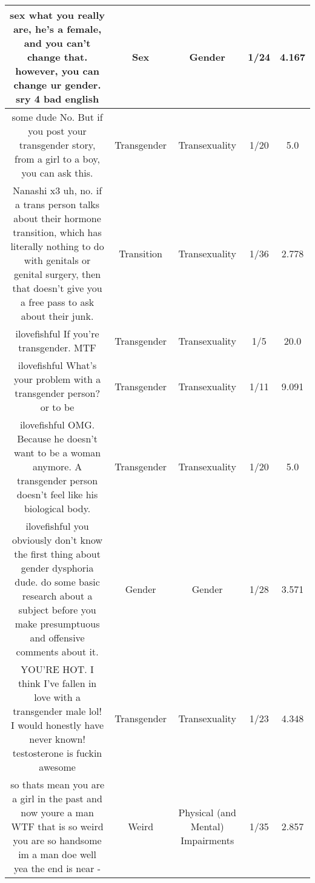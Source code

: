 \documentclass[11pt]{article}
\newlength\mylength
\begin{document}
\begin{center}
\begin{longtable}{|C{.40\mylength}|C{.30\mylength}|C{.15\mylength}|C{.15\mylength}|C{.15\mylength}|}
  sex   what you really are, he's a female, and you can't change that. however, you can change ur gender. sry 4 bad english  & Sex & Gender & 1/24 & 4.167 \\  \hline
   some dude No. But if you post your transgender story, from a girl to a boy, you can ask this.  & Transgender & Transexuality & 1/20 & 5.0 \\  \hline
   Nanashi x3 uh, no. if a trans person talks about their hormone transition, which has literally nothing to do with genitals or genital surgery, then that doesn't give you a free pass to ask about their junk.  & Transition & Transexuality & 1/36 & 2.778 \\  \hline
   ilovefishful If you're transgender. MTF  & Transgender & Transexuality & 1/5 & 20.0 \\  \hline
   ilovefishful What's your problem with a transgender person? or to be  & Transgender & Transexuality & 1/11 & 9.091 \\  \hline
   ilovefishful OMG. Because he doesn't want to be a woman anymore. A transgender person doesn't feel like his biological body.  & Transgender & Transexuality & 1/20 & 5.0 \\  \hline
   ilovefishful you obviously don't know the first thing about gender dysphoria dude. do some basic research about a subject before you make presumptuous and offensive comments about it.  & Gender & Gender & 1/28 & 3.571 \\  \hline
  YOU'RE HOT. I think I've fallen in love with a transgender male lol! I would honestly have never known! testosterone is fuckin awesome  & Transgender & Transexuality & 1/23 & 4.348 \\  \hline
  so thats mean you are a girl in the past and now youre a man WTF that is so weird you are so handsome im a man doe well yea the end is near  -   & Weird & Physical (and Mental) Impairments & 1/35 & 2.857 \\  \hline

\end{longtable}
\end{center}
\end{document}
